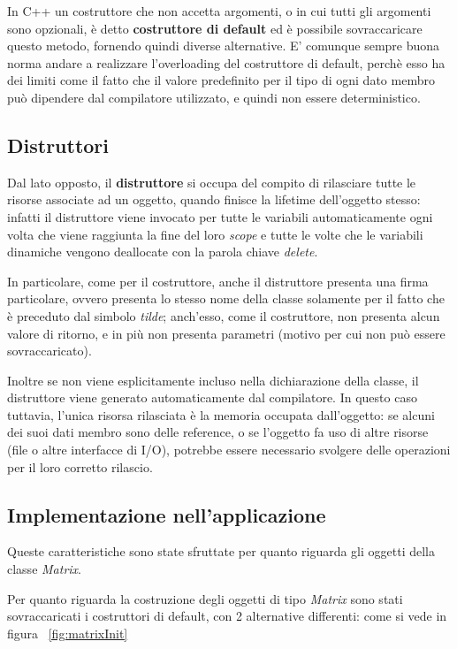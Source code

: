 In C++ un costruttore che non accetta argomenti, o in cui tutti gli argomenti sono opzionali, è detto \textbf{costruttore di default} ed è possibile sovraccaricare questo metodo, fornendo quindi diverse alternative. E' comunque sempre buona norma andare a realizzare l'overloading del costruttore di default, perchè esso ha dei limiti come il fatto che il valore predefinito per il tipo di ogni dato membro può dipendere dal compilatore utilizzato, e quindi non essere deterministico.

\subsection{Distruttori}
Dal lato opposto, il \textbf{distruttore} si occupa del compito di rilasciare tutte le risorse associate ad un oggetto, quando finisce la lifetime dell'oggetto stesso: infatti il distruttore viene invocato per tutte le variabili automaticamente ogni volta che viene raggiunta la fine del loro \textit{scope} e tutte le volte che le variabili dinamiche vengono deallocate con la parola chiave \textit{delete}.

In particolare, come per il costruttore, anche il distruttore presenta una firma particolare, ovvero presenta lo stesso nome della classe solamente per il fatto che è preceduto dal simbolo \textit{tilde}; anch'esso, come il costruttore, non presenta alcun valore di ritorno, e in più non presenta parametri (motivo per cui non può essere sovraccaricato).

Inoltre se non viene esplicitamente incluso nella dichiarazione della classe, il distruttore viene generato automaticamente dal compilatore. In questo caso tuttavia, l’unica risorsa rilasciata è la memoria occupata dall’oggetto: se alcuni dei suoi dati membro sono delle reference, o se l’oggetto fa uso di altre risorse (file o altre interfacce di I/O), potrebbe essere necessario svolgere delle operazioni per il loro corretto rilascio.

\subsection{Implementazione nell'applicazione}
Queste caratteristiche sono state sfruttate per quanto riguarda gli oggetti della classe \textit{Matrix}.

Per quanto riguarda la costruzione degli oggetti di tipo \textit{Matrix} sono stati sovraccaricati i costruttori di default, con 2 alternative differenti: come si vede in figura ~\ref{fig:matrixInit}


